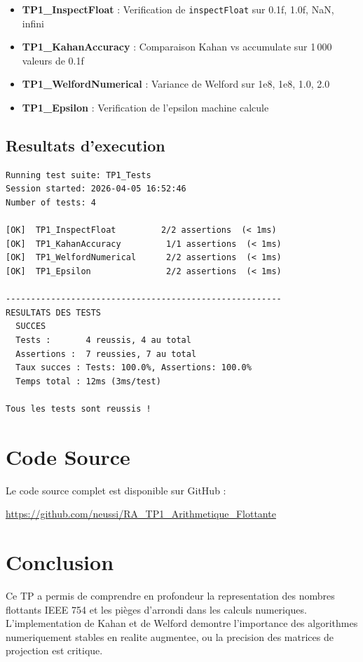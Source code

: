 \documentclass[12pt,a4paper]{article}
\begin{document}
\begin{itemize}
    \item \textbf{TP1\_InspectFloat} : Verification de \texttt{inspectFloat} sur 0.1f, 1.0f, NaN, infini
    \item \textbf{TP1\_KahanAccuracy} : Comparaison Kahan vs accumulate sur 1\,000 valeurs de 0.1f
    \item \textbf{TP1\_WelfordNumerical} : Variance de Welford sur {1e8, 1e8, 1.0, 2.0}
    \item \textbf{TP1\_Epsilon} : Verification de l'epsilon machine calcule
\end{itemize}

\subsection{Resultats d'execution}

\begin{lstlisting}[caption=Sortie de jenga test -- TP1]
Running test suite: TP1_Tests
Session started: 2026-04-05 16:52:46
Number of tests: 4

[OK]  TP1_InspectFloat         2/2 assertions  (< 1ms)
[OK]  TP1_KahanAccuracy         1/1 assertions  (< 1ms)
[OK]  TP1_WelfordNumerical      2/2 assertions  (< 1ms)
[OK]  TP1_Epsilon               2/2 assertions  (< 1ms)

-------------------------------------------------------
RESULTATS DES TESTS
  SUCCES
  Tests :       4 reussis, 4 au total
  Assertions :  7 reussies, 7 au total
  Taux succes : Tests: 100.0%, Assertions: 100.0%
  Temps total : 12ms (3ms/test)

Tous les tests sont reussis !
\end{lstlisting}

\section{Code Source}

Le code source complet est disponible sur GitHub :

\begin{center}
\href{https://github.com/neussi/RA_TP1_Arithmetique_Flottante}%
     {https://github.com/neussi/RA\_TP1\_Arithmetique\_Flottante}
\end{center}

\section{Conclusion}

Ce TP a permis de comprendre en profondeur la representation des nombres flottants IEEE 754
et les pièges d'arrondi dans les calculs numeriques. L'implementation de Kahan et de Welford
demontre l'importance des algorithmes numeriquement stables en realite augmentee, ou la
precision des matrices de projection est critique.
\end{document}
